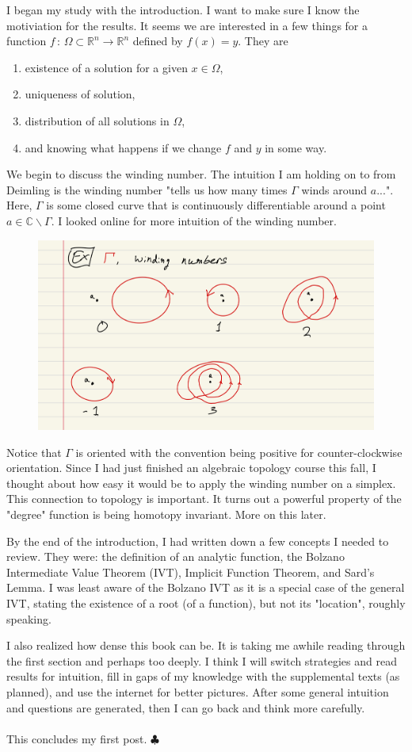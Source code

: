 \documentclass[reqno, 12pt]{article}
\newcommand{\R}{\mathbb{R}}
\newcommand{\END}{\hspace*{\fill} $\clubsuit$}
\begin{document}
I began my study with the introduction. I want to make sure I know the motiviation for the results. It seems we are interested in a few things for a function $f \,: \, \Omega \subset \R^n \rightarrow \R^n$ defined by $f(x) = y$. They are
\begin{enumerate}
\item existence of a solution for a given $x \in \Omega$,
\item uniqueness of solution,
\item distribution of all solutions in $\Omega$,
\item and knowing what happens if we change $f$ and $y$ in some way.
\end{enumerate}
We begin to discuss the winding number. The intuition I am holding on to from Deimling is the winding number "tells us how many times $\Gamma$ winds around $a$...". Here, $\Gamma$ is some closed curve that is continuously differentiable around a point $a \in \mathbb{C}\backslash\Gamma$. I looked online for more intuition of the winding number.
\begin{figure}[h]
	\centering
	\includegraphics[width = .8 \textwidth]{winding-number-1.jpeg}
\end{figure}
Notice that $\Gamma$ is oriented with the convention being positive for counter-clockwise orientation. Since I had just finished an algebraic topology course this fall, I thought about how easy it would be to apply the winding number on a simplex. This connection to topology is important. It turns out a powerful property of the "degree" function is being homotopy invariant. More on this later.

By the end of the introduction, I had written down a few concepts I needed to review. They were: the definition of an analytic function, the Bolzano Intermediate Value Theorem (IVT), Implicit Function Theorem, and Sard's Lemma. I was least aware of the Bolzano IVT as it is a special case of the general IVT, stating the existence of a root (of a function), but not its "location", roughly speaking. 

I also realized how dense this book can be. It is taking me awhile reading through the first section and perhaps too deeply. I think I will switch strategies and read results for intuition, fill in gaps of my knowledge with the supplemental texts (as planned), and use the internet for better pictures. After some general intuition and questions are generated, then I can go back and think more carefully. 
\\\\This concludes my first post. \END
\end{document}
